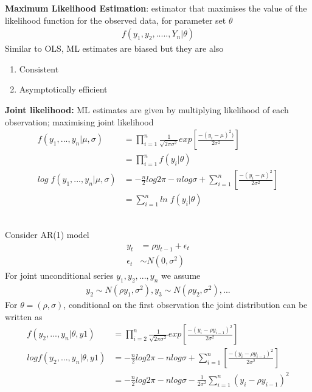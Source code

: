 \documentclass{beamer}
\begin{document}
\begin{frame}
  \textbf{Maximum Likelihood Estimation}: estimator that maximises the value of the likelihood function for the observed data, for parameter set $\theta$
  \begin{align}
    f(y_1,y_2,.....,Y_n| \theta)
  \end{align}
  \medskip
  Similar to OLS, ML estimates are biased but they are also
  \begin{enumerate}
    \item Consistent
    \item Asymptotically efficient
  \end{enumerate}  
\end{frame}

\begin{frame}  
  \textbf{Joint likelihood:} ML estimates are given by multiplying likelihood of each observation; maximising joint likelihood  
\begin{align}
  f(y_1,...,y_n| \mu, \sigma) &= \prod^n_{i=1} \frac{1}{\sqrt{2\pi \sigma^2}} exp \left [ \frac{-(y_i-\mu)^2)}{2\sigma^2} \right ] \\ \nonumber
  &= \prod^n_{i=1} f(y_i| \theta)\\
  log \;f(y_1,...,y_n| \mu, \sigma) &= -\frac{n}{2} log 2\pi - n log \sigma + \sum^n_{i=1} \left [ \frac{-(y_i-\mu)^2}{2\sigma^2} \right ] \\ \nonumber
  &= \sum^n_{i=1} ln\; f(y_i| \theta)
\end{align}\
\end{frame}

\begin{frame}
  Consider AR(1) model
  \begin{align}
  y_t&= \rho y_{t-1} + \epsilon_t \\ 
   \epsilon_t &\sim N(0, \sigma^2)
  \end{align}
  For joint unconditional series $y_1,y_2,...,y_n$ we assume
  \begin{align}
     y_2\sim N(\rho y_1,\sigma^2), y_3\sim N(\rho y_2,\sigma^2),... 
   \end{align} 
   \medskip  
  For $\theta= (\rho, \sigma)$, conditional on the first observation the joint distribution can be written as
\begin{align}
  f(y_2,...,y_n| \theta, y1) &= \prod^n_{i=2} \frac{1}{\sqrt{2 \pi \sigma^2}} exp \left [ \frac{-(y_i - \rho y_{i-1})^2}{2\sigma^2} \right ] \\
  log f(y_2,...,y_n| \theta, y1) &= -\frac{n}{2} log 2\pi - n log \sigma + \sum^n_{i=1} 
  \left [ \frac{-(y_i-\rho y_{i-1})^2}{2\sigma^2} \right ]\\ \nonumber
  &=  -\frac{n}{2} log 2\pi - n log \sigma - \frac{1}{2\sigma^2} \sum^n_{i=1}(y_i-\rho y_{i-1})^2
\end{align}
\end{frame}
\end{document}
